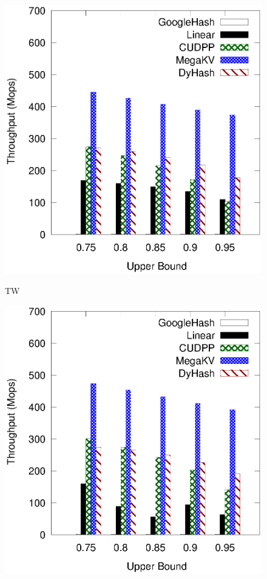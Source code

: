 \begin{figure}[h]
	\begin{minipage}{0.19\linewidth}\centering
		\includegraphics[width=\linewidth]{pic/static-upper/upper_insert_twitter.eps}
		\centerline{TW}
	\end{minipage}
	\hfill
	\begin{minipage}{0.19\linewidth}\centering
	\includegraphics[width=\linewidth]{pic/static-upper/upper_insert_reddit.eps}

\end{minipage}
\end{figure}
